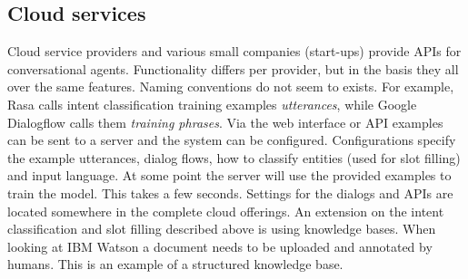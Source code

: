 \subsection{Cloud services}
\label{subsec:cloud_services}
Cloud service providers and various small companies (start-ups) provide APIs for conversational agents.
Functionality differs per provider, but in the basis they all over the same features.
Naming conventions do not seem to exists.
For example, Rasa calls intent classification training examples \textit{utterances}, while Google Dialogflow calls them \textit{training phrases}.
Via the web interface or API examples can be sent to a server and the system can be configured.
Configurations specify the example utterances, dialog flows, how to classify entities (used for slot filling) and input language.
At some point the server will use the provided examples to train the model.
This takes a few seconds.
Settings for the dialogs and APIs are located somewhere in the complete cloud offerings.
An extension on the intent classification and slot filling described above is using knowledge bases.
When looking at IBM Watson a document needs to be uploaded and annotated by humans.
This is an example of a structured knowledge base.

